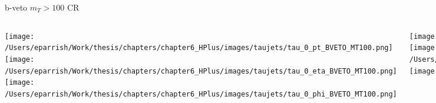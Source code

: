 \documentclass[aspectratio=169,xcolor=table]{beamer}
\begin{document}
    \begin{frame}[t]{b-veto $m_{T}>100$ CR}
      \begin{columns}[t]
          \texttt{[image: /Users/eparrish/Work/thesis/chapters/chapter6\_HPlus/images/taujets/tau\_0\_pt\_BVETO\_MT100.png]}
          \texttt{[image: /Users/eparrish/Work/thesis/chapters/chapter6\_HPlus/images/taujets/tau\_0\_eta\_BVETO\_MT100.png]}
          \texttt{[image: /Users/eparrish/Work/thesis/chapters/chapter6\_HPlus/images/taujets/tau\_0\_phi\_BVETO\_MT100.png]}

          \texttt{[image: /Users/eparrish/Work/thesis/chapters/chapter6\_HPlus/images/taujets/tau\_0\_upsilon\_BVETO\_MT100.png]}
          \texttt{[image: /Users/eparrish/Work/thesis/chapters/chapter6\_HPlus/images/taujets/tau\_0\_charged\_tracks\_0\_pt\_BVETO\_MT100.png]}
          \texttt{[image: /Users/eparrish/Work/thesis/chapters/chapter6\_HPlus/images/taujets/n\_jets\_BVETO\_MT100.png]}

          \texttt{[image: /Users/eparrish/Work/thesis/chapters/chapter6\_HPlus/images/taujets/met\_et\_BVETO\_MT100.png]}
          \texttt{[image: /Users/eparrish/Work/thesis/chapters/chapter6\_HPlus/images/taujets/met\_phi\_BVETO\_MT100.png]}
          \texttt{[image: /Users/eparrish/Work/thesis/chapters/chapter6\_HPlus/images/taujets/n\_bjets\_DL1r\_FixedCutBEff\_70\_BVETO\_MT100.png]}

          \texttt{[image: /Users/eparrish/Work/thesis/chapters/chapter6\_HPlus/images/taujets/bjet\_0\_pt\_BVETO\_MT100.png]}
          \texttt{[image: /Users/eparrish/Work/thesis/chapters/chapter6\_HPlus/images/taujets/bjet\_0\_eta\_BVETO\_MT100.png]}
          \texttt{[image: /Users/eparrish/Work/thesis/chapters/chapter6\_HPlus/images/taujets/bjet\_0\_phi\_BVETO\_MT100.png]}

      \end{columns}
    \end{frame}
\end{document}
